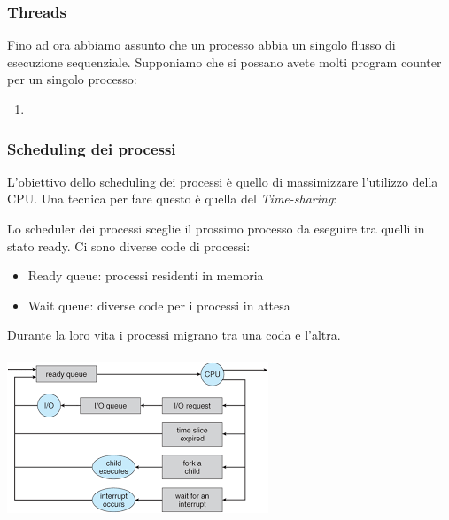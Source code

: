 \documentclass[11pt]{article}
\begin{document}
\subsubsection{Threads}
Fino ad ora abbiamo assunto che un processo abbia un singolo flusso di esecuzione sequenziale. Supponiamo che si possano avete molti program counter per un singolo processo:
\begin{enumerate}
\item 
\end{enumerate}

\subsubsection{Scheduling dei processi}
L'obiettivo dello scheduling dei processi è quello di massimizzare l'utilizzo della CPU. Una tecnica per fare questo è quella del \emph{Time-sharing}:

Lo scheduler dei processi sceglie il prossimo processo da eseguire tra quelli in stato ready.
Ci sono diverse code di processi:
\begin{itemize}
 \item Ready queue: processi residenti in memoria
\item Wait queue: diverse code per i processi in attesa
\end{itemize}
Durante la loro vita i processi migrano tra una coda e l'altra.
\\ \\
\includegraphics[scale=1.1]{processQueue.png}
\\ \\
\end{document}
